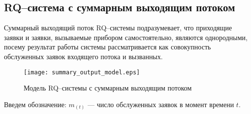 \subsection{RQ--система с суммарным выходящим потоком}
Суммарный выходящий поток RQ--системы подразумевает, что приходящие заявки и заявки, вызываемые прибором самостоятельно, являются однородными, посему результат работы системы рассматривается как совокупность обслуженных заявок входящего потока и вызванных. 
\begin{figure}[H]
	\centering
	\texttt{[image: summary\_output\_model.eps]}
	\caption{Модель RQ--системы с суммарным выходящим потоком}
	\label{summary_output_model_fig}
\end{figure}
Введем обозначение: $m_(t)$ --- число обслуженных заявок в момент времени $t$.


